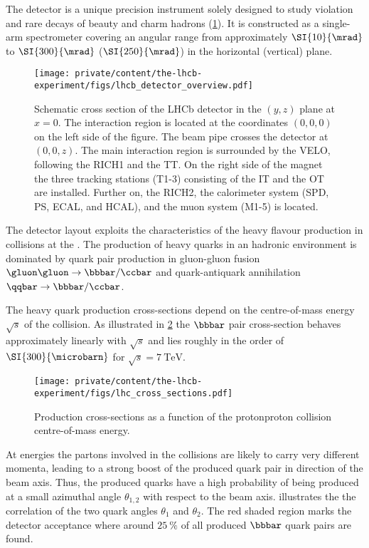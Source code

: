 The \LHCb detector is a unique precision instrument solely designed to study \CP
violation and rare decays of beauty and charm hadrons
(\cref{fig:lhcb_experiment:detector:overview}). It is constructed as a
single-arm spectrometer covering an angular range from approximately
$\SI{10}{\mrad}$ to $\SI{300}{\mrad}$ ($\SI{250}{\mrad}$) in the horizontal
(vertical) plane.
%
\begin{figure}[t]
  \centering
    \texttt{[image: private/content/the-lhcb-experiment/figs/lhcb\_detector\_overview.pdf]}
  \caption{
    Schematic cross section of the \acs{LHCb} detector in the $(y,z)$ plane at
  $x=0$. The \protonproton interaction region is located at the coordinates
  $(0,0,0)$ on the left side of the figure. The beam pipe crosses the detector at
  $(0,0,z)$. The main interaction region is surrounded by the \acs*{VELO},
  following the \acs*{RICH}1 and the \acs*{TT}. On the right side of the magnet
  the three tracking stations (T1-3) consisting of the \acs*{IT} and the
  \acs*{OT} are installed. Further on, the \acs*{RICH}2, the calorimeter system
  (\acs*{SPD}, \acs*{PS}, \acs*{ECAL}, and \acs*{HCAL}), and the muon system
  (M1-5) is located. }
  \label{fig:lhcb_experiment:detector:overview}
\end{figure}
%
The detector layout exploits the characteristics of the heavy flavour production
in \protonproton collisions at the \LHC. The production of heavy quarks in an
hadronic environment is dominated by quark pair production in gluon-gluon fusion
$\gluon\gluon\to\bbbar/\ccbar$ and quark-antiquark annihilation
$\qqbar\to\bbbar/\ccbar$.

The heavy quark production cross-sections depend on the centre-of-mass energy
$\sqrt{s}$ of the \protonproton collision. As illustrated in
\cref{fig:lhcb_experiment:detector:cross_section} the $\bbbar$ pair
cross-section behaves approximately linearly with $\sqrt{s}$ and lies roughly in
the order of $\SI{300}{\microbarn}$ for $\sqrt{s}=\SI{7}{\TeV}$.
%
\begin{figure}[t]
  \centering
    \texttt{[image: private/content/the-lhcb-experiment/figs/lhc\_cross\_sections.pdf]}
  \caption{
    Production cross-sections as a function of the \acl{protonproton} collision centre-of-mass energy. \cite{Campbell:2006wx}
  }
  \label{fig:lhcb_experiment:detector:cross_section}
\end{figure}
%
At \LHC energies the partons involved in the collisions are likely to carry very
different momenta, leading to a strong boost of the produced quark pair in
direction of the beam axis. Thus, the produced quarks have a high probability of
being produced at a small azimuthal angle $\theta_{1,2}$ with respect to the
beam axis.  illustrates the the
correlation of the two quark angles $\theta_{1}$ and $\theta_{2}$. The red
shaded region marks the \LHCb detector acceptance where around
$\SI{25}{\percent}$ of all produced $\bbbar$ quark pairs are found.

